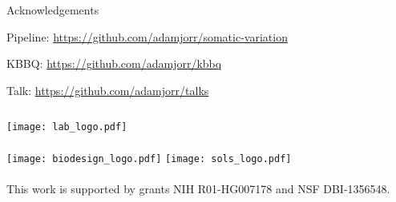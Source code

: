 \documentclass{beamer}
\begin{document}
\begin{frame}{Acknowledgements}

Pipeline:  \url{https://github.com/adamjorr/somatic-variation}

KBBQ:  \url{https://github.com/adamjorr/kbbq}

Talk:  \url{https://github.com/adamjorr/talks}

\vfill

\begin{columns}
	\texttt{[image: lab\_logo.pdf]}
	\\~\\
	\texttt{[image: biodesign\_logo.pdf]}
	\texttt{[image: sols\_logo.pdf]}
	\\~\\
	This work is supported by grants NIH R01-HG007178 and NSF DBI-1356548.
\end{columns}

\end{frame}
\end{document}
